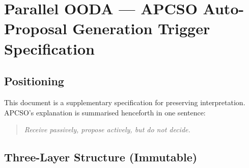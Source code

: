 
\chapter{Parallel OODA --- APCSO Auto-Proposal Generation
Trigger Specification}
\label{ch:parallel-ooda}


\section{Positioning}
\label{sec:parallel-ooda-positioning}

This document is a supplementary specification for preserving
interpretation. APCSO's explanation is summarised henceforth in one
sentence:

\begin{quote}
\itshape
Receive passively, propose actively, but do not decide.
\end{quote}

\section{Three-Layer Structure (Immutable)}
\label{sec:parallel-ooda-layers}

